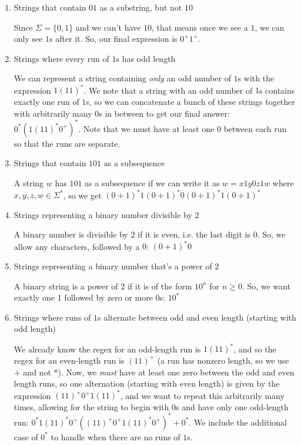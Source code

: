 \documentclass[fleqn]{article}
\begin{document}
\begin{enumerate}
    \item Strings that contain $01$ as a substring, but not $10$
    \begin{answer}
        Since $\Sigma = \{0,1\}$ and we can't have $10$, that means once we see a $1$, we can only see $1$s after it. So, our final expression is $\boxed{0^+ 1^+}$.
    \end{answer}
    \item Strings where every run of $1$s has odd length
    \begin{answer}
        We can represent a string containing \textit{only} an odd number of $1$s with the expression $1(11)^*$. We note that a string with an odd number of $1$s contains exactly one run of $1$s, so we can concatenate a bunch of these strings together with arbitrarily many $0$s in between to get our final answer: $\boxed{0^*(1(11)^*0^+)^*}$. Note that we must have at least one $0$ between each run so that the runs are separate.
    \end{answer}
    \item Strings that contain $101$ as a subsequence
    \begin{answer}
        A string $w$ has $101$ as a subsequence if we can write it as $w = x1y0z1w$ where
        $x,y,z,w \in \Sigma^*$, so we get $\boxed{(0+1)^* 1 (0+1)^* 0 (0+1)^* 1 (0 + 1)^*}$
    \end{answer}
    \item Strings representing a binary number divisible by $2$
    \begin{answer}
        A binary number is divisible by $2$ if it is even, i.e. the last digit is $0$.
        So, we allow any characters, followed by a $0$: $\boxed{(0+1)^* 0}$
    \end{answer}
    \item Strings representing a binary number that's a power of $2$
    \begin{answer}
        A binary string is a power of $2$ if it is of the form $10^n$ for $n \geq 0$. So, we want exactly one $1$ followed by zero or more $0$s: $\boxed{10^*}$
    \end{answer}
    \item Strings where runs of $1$s alternate between odd and even length (starting with odd length)
    \begin{answer}
        We already know the regex for an odd-length run is $1(11)^*$, and so the regex for an even-length run is $(11)^+$ (a run has nonzero length, so we use $+$ and not $*$). Now, we \textit{must} have at least one zero between the odd and even length runs, so one alternation (starting with even length) is given by the expression $(11)^+ 0^+ 1(11)^*$, and we want to repeat this arbitrarily many times, allowing for the string to begin with $0$s and have only one odd-length run: $\boxed{0^* 1(11)^* 0^+ ((11)^+ 0^+ 1(11)^* 0^+)^* + 0^*}$. We include the additional case of $0^*$ to handle when there are no runs of $1$s.
    \end{answer}
\end{enumerate}
\end{document}
